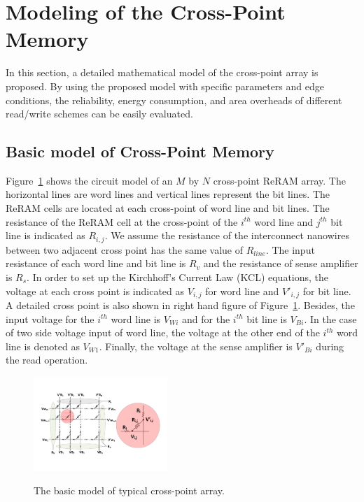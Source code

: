 \section{Modeling of the Cross-Point Memory}\label{sec:model}

In this section, a detailed mathematical model of the cross-point array is proposed. By using the proposed model with specific parameters and
edge conditions, the reliability, energy consumption, and area overheads of different read/write schemes can be easily evaluated.

\subsection{Basic model of Cross-Point Memory}
Figure~\ref{fig:modeling} shows the circuit model of an $M$ by $N$ cross-point ReRAM array. The horizontal lines are word lines and vertical lines represent the bit lines. The ReRAM cells are located at each cross-point of word line and bit lines. The resistance of the ReRAM cell at the cross-point of the $i^{th}$ word line and $j^{th}$ bit line is indicated as $R_{i,j}$. We assume the resistance of the interconnect nanowires between two adjacent cross point has the same value of $R_{line}$. The input resistance of each word line and bit line is $R_v$ and the resistance of sense amplifier is $R_s$. In order to set up the Kirchhoff's Current Law (KCL) equations, the voltage at each cross point is indicated as $V_{i,j}$ for word line and $V'_{i,j}$ for bit line. A detailed cross point is also shown in right hand figure of Figure~\ref{fig:modeling}. Besides, the input voltage for the $i^{th}$ word line is $V_{Wi}$ and for the $i^{th}$ bit line is $V_{Bi}$. In the case of two side voltage input of word line, the voltage at the other end of the $i^{th}$ word line is denoted as $V_{W1}$. Finally, the voltage at the sense amplifier is $V'_{Bi}$ during the read operation.

\begin{figure}%
\centering
  \includegraphics[width=0.45\textwidth]{./figures/model_reverse.pdf}\\
  \caption{The basic model of typical cross-point array.}\label{fig:modeling}
  \vspace{-12pt}
\end{figure}

